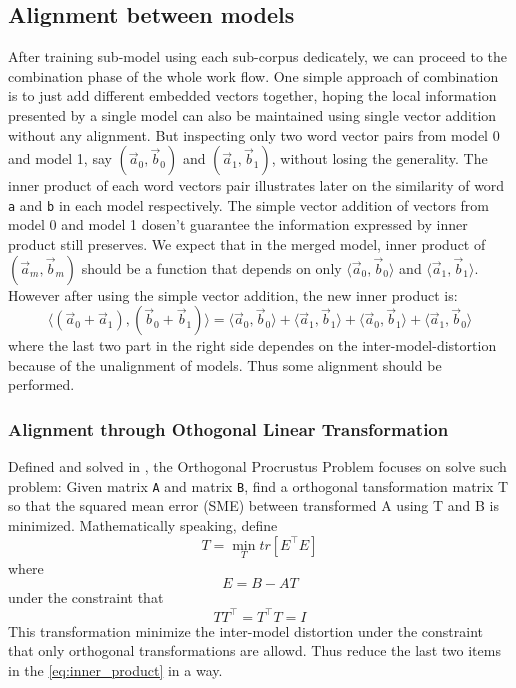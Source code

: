 \documentclass[11pt,a4paper]{article}
\begin{document}
  \subsection{Alignment between models}
  After training sub-model using each sub-corpus dedicately, we can proceed to the combination phase of the whole work flow. One simple approach of combination is to just add different embedded vectors together, hoping the local information presented by a single model can also be maintained using single vector addition without any alignment. But inspecting only two word vector pairs from model 0 and model 1, say $(\vec{a}_0, \vec{b}_0)$ and $(\vec{a}_1, \vec{b}_1)$, without losing the generality. The inner product of each word vectors pair illustrates later on the similarity of word \verb|a| and \verb|b| in each model respectively. The simple vector addition of vectors from model 0 and model 1 dosen't guarantee the information expressed by inner product still preserves. We expect that in the merged model, inner product of $(\vec{a}_m,\vec{b}_m)$ should be a function that depends on only $\langle\vec{a}_0,\vec{b}_0\rangle$ and $\langle\vec{a}_1, \vec{b}_1\rangle$. However after using the simple vector addition, the new inner product is:
  \begin{equation}\label{eq:inner_product}
  \langle(\vec{a}_0+\vec{a}_1), (\vec{b}_0+\vec{b}_1)\rangle=
    \langle\vec{a}_0,\vec{b}_0\rangle+
    \langle\vec{a}_1,\vec{b}_1\rangle+
    \langle\vec{a}_0,\vec{b}_1\rangle+
    \langle\vec{a}_1,\vec{b}_0\rangle
  \end{equation}
  where the last two part in the right side dependes on the inter-model-distortion because of the unalignment of models. Thus some alignment should be performed.

  \subsubsection{Alignment through Othogonal Linear Transformation}
  Defined and solved in \cite{schonemann1966generalized}, the Orthogonal Procrustus Problem focuses on solve such problem: Given matrix \verb|A| and matrix \verb|B|, find a orthogonal tansformation matrix T so that the squared mean error (SME) between transformed A using T and B is minimized. Mathematically speaking, define
  \begin{equation}
  T = \min_{T}tr[E^\intercal E]
  \end{equation}
  where 
  \begin{equation}
  E=B-AT
  \end{equation}
  under the constraint that 
  \begin{equation}
  TT^\intercal=T^\intercal T=I
  \end{equation}
  This transformation minimize the inter-model distortion under the constraint that only orthogonal transformations are allowd. Thus reduce the last two items in the \eqref{eq:inner_product} in a way.
\end{document}
